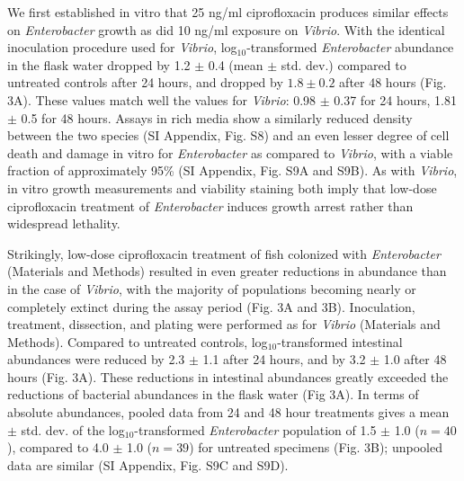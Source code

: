 We first established in vitro that 25 ng/ml ciprofloxacin produces similar effects on \textit{Enterobacter} growth as did 10 ng/ml exposure on \textit{Vibrio}. With the identical inoculation procedure used for \textit{Vibrio}, log$_{10}$-transformed \textit{Enterobacter} abundance in the flask water dropped by 1.2 $\pm$ 0.4 (mean $\pm$ std. dev.) compared to untreated controls after 24 hours, and dropped by $1.8 \pm 0.2$ after 48 hours (Fig. 3A). These values match well the values for \textit{Vibrio}: 0.98 $\pm$ 0.37 for 24 hours, 1.81 $\pm$ 0.5 for 48 hours. Assays in rich media show a similarly reduced density between the two species (SI Appendix, Fig. S8) and an even lesser degree of cell death and damage in vitro for  \textit{Enterobacter} as compared to \textit{Vibrio}, with a viable fraction of approximately 95\% (SI Appendix, Fig. S9A and S9B). As with \textit{Vibrio}, in vitro growth measurements and viability staining both imply that low-dose ciprofloxacin treatment of \textit{Enterobacter} induces growth arrest rather than widespread lethality.

Strikingly, low-dose ciprofloxacin treatment of fish colonized with \textit{Enterobacter}  (Materials and Methods) resulted in even greater reductions in abundance than in the case of \textit{Vibrio}, with the majority of populations becoming nearly or completely extinct during the assay period (Fig. 3A and 3B). Inoculation, treatment, dissection, and plating were performed as for \textit{Vibrio} (Materials and Methods). Compared to untreated controls, log$_{10}$-transformed intestinal abundances were reduced by 2.3 $\pm$ 1.1 after 24 hours, and by 3.2 $\pm$ 1.0 after 48 hours (Fig. 3A). These reductions in intestinal abundances greatly exceeded the reductions of bacterial abundances in the flask water (Fig 3A). In terms of absolute abundances, pooled data from 24 and 48 hour treatments gives a mean $\pm$ std. dev. of the log$_{10}$-transformed \textit{Enterobacter}  population of 1.5 $\pm$ 1.0 ($n=40$), compared to 4.0 $\pm$ 1.0 ($n=39$) for untreated specimens (Fig. 3B); unpooled data are similar (SI Appendix, Fig. S9C and S9D). 


